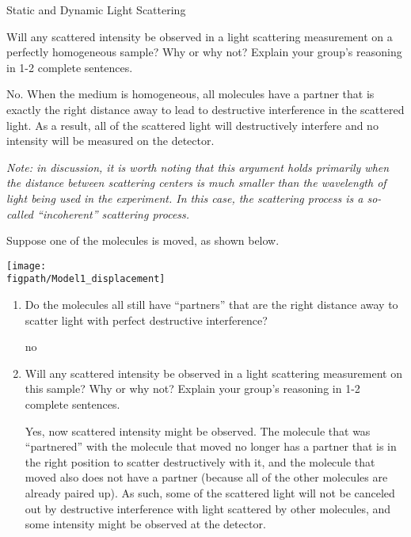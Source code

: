 \begin{activity}{Static and Dynamic Light Scattering}
\begin{ctqs}
	
	\question Will any scattered intensity be observed in a light scattering measurement on a perfectly homogeneous sample?  Why or why not?  Explain your group's reasoning in 1-2 complete sentences.
	
		\begin{solution}[1.5in]{}
		
			No.  When the medium is homogeneous, all molecules have a partner that is exactly the right distance away to lead to destructive interference in the scattered light.  As a result, all of the scattered light will destructively interfere and no intensity will be measured on the detector.
			
			\emph{Note: in discussion, it is worth noting that this argument holds primarily when the distance between scattering centers is much smaller than the wavelength of light being used in the experiment.  In this case, the scattering process is a so-called ``incoherent'' scattering process.}
			
		\end{solution}

	\question Suppose one of the molecules is moved, as shown below.
	
	\vspace{6pt}
	\centerline{\texttt{[image: \\figpath/Model1\_displacement]}}

		\begin{enumerate}
			\item Do the molecules all still have ``partners'' that are the right distance away to scatter light with perfect destructive interference? 
	
		\begin{solution}[0.5in]{}
			no
		\end{solution}
			
			\item Will any scattered intensity be observed in a light scattering measurement on this sample?  Why or why not?  Explain your group's reasoning in 1-2 complete sentences.
	
		\begin{solution}[1in]{}
			Yes, now scattered intensity might be observed. The molecule that was ``partnered'' with the molecule that moved no longer has a partner that is in the right position to scatter destructively with it, and the molecule that moved also does not have a partner (because all of the other molecules are already paired up).  As such, some of the scattered light will not be canceled out by destructive interference with light scattered by other molecules, and some intensity might be observed at the detector.
		\end{solution}
			

\end{enumerate}
\end{ctqs}
\end{activity}
